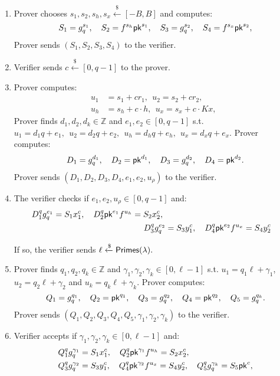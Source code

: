 \documentclass[runningheads]{llncs}
\newcommand{\pk}{{\sf pk}}
\begin{document}
\begin{enumerate}
	
	\item		Prover chooses %
	$s_1, s_2, s_h, s_x \xleftarrow{\$}  [-B, B]$  and computes:
	\[
 S_1 =g_q^{s_1}, \quad S_2= f^{s_h} \pk^ {s_1}, \quad S_3 = g_q^{s_2}, \quad S_4= f^{s_x} \pk^ {s_2},
	\]
	Prover sends $( S_1, S_2, S_3,S_4)$ to the verifier.\\
	
	\item	Verifier sends $c \xleftarrow{\$}  [0,  q-1]$ to the prover.\\
	
	\item	Prover computes:
	\begin{align*}
	u_1 &= s_1 + c r_1, ~~ u_2 = s_2 + c r_2, \\
	u_{h} &= s_{h} + c\cdot h,~~
	u_{x} = s_{x} + c\cdot Kx,~~
	\end{align*}
	Prover finds $d_1,d_2,  d_k \in \mathbb{Z}$ and $e_1,e_2\in [0, q-1]$ s.t. 
	$u_1 = d_1 q + e_1,~~u_2 = d_2 q + e_2,~~u_h = d_h q + e_h,~~u_x = d_x q + e_x$.
	Prover computes:
	\[
	D_1 = g_q^{d_1},  \quad D_2 = \pk^{d_1},  \quad D_3 = g_q^{d_2},\quad D_4 = \pk^{d_2}.
	\] 
	Prover sends $(D_1, D_2, D_3,D_4,e_1,e_2, u_\rho)$ to the verifier.\\
	
	\item	The verifier checks if $e_1,e_2,u_\rho \in [0, q-1]$ and:
	\begin{align*}
	D_1^q g_q^{e_1} = S_1 x_1^c, \quad D_2^q \pk^{e_1} f^{u_h} = S_2 x_2^c, \ \\
	D_3^q g_q^{e_2} &= S_3 y_1^c, \quad 	D_4^q \pk^{e_2} f^{u_x} = S_4 y_2^c 
	\end{align*}
	
	
	If so, the verifier sends $\ell \xleftarrow{\$} {\sf Primes}(\lambda).$\\
	
	
	\item	Prover finds $q_1,q_2, q_k \in \mathbb{Z}$ and $\gamma_1,\gamma_2, \gamma_k \in [0, \ell-1]$ s.t. 
	$u_1 = q_1\ell + \gamma_1$,$u_2 = q_2\ell + \gamma_2$  and $u_k = q_k \ell + \gamma_k$.
	Prover computes:
	\[
	Q_1 = g_q^{q_1},\quad Q_2 = \pk^{q_1},  \quad Q_3 = g_q^{q_2}, \quad Q_4 = \pk^{q_2},  \quad Q_5 = g_q^{q_k}.
	\] 
	Prover sends $(Q_1, Q_2, Q_3,Q_4, Q_5 , \gamma_1, \gamma_2, \gamma_k)$ to the verifier.
	
	
	\item	Verifier accepts if $\gamma_1, \gamma_2, \gamma_k \in [0, \ell-1]$ and:
	\begin{align*}
	Q_1^q g_q^{\gamma_1} &= S_1 x_1^c, 
	\quad Q_2^q \pk^{\gamma_1} f^{u_h} = S_2 x_2^c, \ \\
	Q_3^q g_q^{\gamma_2} &= S_3 y_1^c, 
	\quad Q_4^q \pk^{\gamma_2} f^{u_x} = S_4 y_2^c ,
	\quad Q_5^q g_q^{\gamma_k} = S_5 \pk^c, 
	\end{align*}
	
\end{enumerate}
\end{document}
